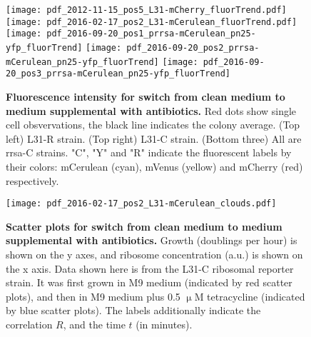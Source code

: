 
\begin{figure}
    \centering    
    \texttt{[image: pdf\_2012-11-15\_pos5\_L31-mCherry\_fluorTrend.pdf]}
    \texttt{[image: pdf\_2016-02-17\_pos2\_L31-mCerulean\_fluorTrend.pdf]} \\
    \texttt{[image: pdf\_2016-09-20\_pos1\_prrsa-mCerulean\_pn25-yfp\_fluorTrend]} %
    \texttt{[image: pdf\_2016-09-20\_pos2\_prrsa-mCerulean\_pn25-yfp\_fluorTrend]}
    \texttt{[image: pdf\_2016-09-20\_pos3\_prrsa-mCerulean\_pn25-yfp\_fluorTrend]}            
    \caption{ 
        \textbf{Fluorescence intensity for switch from clean medium to medium supplemental with antibiotics.}
        Red dots show single cell obsvervations, the black line indicates the colony average.
        (Top left) L31-R strain. 
        (Top right) L31-C strain.
        (Bottom three) All are rrsa-C strains.  
        "C", "Y" and "R" indicate the fluorescent labels by their colors: mCerulean (cyan), mVenus (yellow) and mCherry (red) respectively.    
    }
    \label{fig:ribo:fluorsignals}
\end{figure}


\begin{figure}
    \centering    
    \texttt{[image: pdf\_2016-02-17\_pos2\_L31-mCerulean\_clouds.pdf]}
    \caption{ 
        \textbf{Scatter plots for switch from clean medium to medium supplemental with antibiotics.}
        Growth (doublings per hour) is shown on the y axes, and ribosome concentration (a.u.) is shown on the x axis.
        Data shown here is from the L31-C ribosomal reporter strain. It was first grown in M9 medium (indicated by red scatter plots), and then in M9 medium plus 0.5 $\upmu$M tetracycline (indicated by blue scatter plots).     
        The labels additionally indicate the correlation $R$, and the time $t$ (in minutes).
    }
    \label{fig:ribo:scatter1}
\end{figure}

